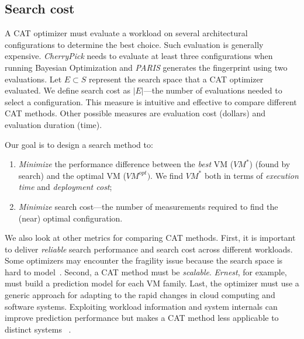 \subsection*{Search cost}
A CAT optimizer must evaluate a workload
on several architectural configurations to determine the best choice.
Such evaluation is generally expensive.
\emph{CherryPick} needs to evaluate at least three configurations
when running Bayesian Optimization and
\emph{PARIS} generates the fingerprint using two evaluations.
Let $E \subset S$ represent the search space that a CAT optimizer evaluated.
We define search cost as $|E|$---the number of evaluations needed to
select a configuration.
This measure is intuitive and effective to compare different CAT methods.
Other possible measures are
evaluation cost (dollars) and evaluation duration (time).

Our goal is to design a search method to:
\begin{enumerate}[leftmargin=*]
    \item \textit{Minimize} the performance difference between
the \emph{best} VM  ($\mathit{VM^*}$) (found by search) and the optimal VM  ($\mathit{VM}^{opt})$. We find $\mathit{VM^*}$ both in terms of \textit{execution time} and \textit{deployment cost};
    \item \textit{Minimize} search cost---the number of measurements required to find the (near) optimal configuration.
\end{enumerate}

We also look at other metrics for comparing CAT methods.
First, it is important to deliver \emph{reliable}
search performance and search cost across different workloads.
Some optimizers may encounter the fragility issue because
the search space is hard to model~\cite{Hsu2018Arrow}.
Second, a CAT method must be \emph{scalable}.
\emph{Ernest}, for example, must build a prediction model
for each VM family. 
Last, the optimizer must use a generic approach for adapting to
the rapid changes in cloud computing and software systems.
Exploiting workload information and system internals
can improve prediction performance but
makes a CAT method less applicable to distinct systems
~\cite{Wang2004,Venkataraman2016}.
